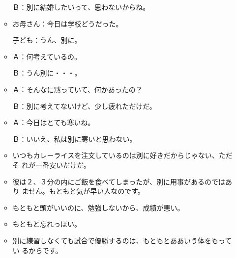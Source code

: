 \documentclass[
uplatex,
b5paper,
10pt,
dvipdfmx
]{jsbook}
\begin{document}
\begin{enumerate}
\begin{itemize}
      Ｂ：別に結婚したいって、思わないからね。

\item お母さん：今日は学校どうだった。

      子ども：うん、別に。

\item Ａ：何考えているの。

      Ｂ：うん別に・・・。

\item Ａ：そんなに黙っていて、何かあったの？  

      Ｂ：別に考えてないけど、少し疲れただけだ。

\item Ａ：今日はとても寒いね。  

      Ｂ：いいえ、私は別に寒いと思わない。

\item いつもカレーライスを注文しているのは別に好きだからじゃない、ただそ
      れが一番安いだけだ。

\item 彼は２、３分の内にご飯を食べてしまったが、別に用事があるのではあり
      ません。もともと気が早い人なのです。

\item もともと頭がいいのに、勉強しないから、成績が悪い。
\item もともと忘れっぽい。
\item 別に練習しなくても試合で優勝するのは、もともとああいう体をもってい
      るからです。
\end{itemize}
\end{enumerate}
\end{document}
